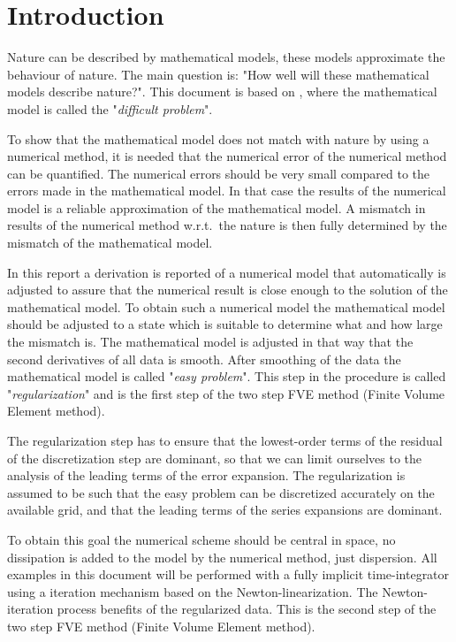 \chapter{Introduction}\label{sec:introduction}
Nature can be described by mathematical models, these models approximate the behaviour of nature.
The main question is: "How well will these mathematical models describe nature?".
This document is based on \citet{Borsboom1998}, where the mathematical model is called the "\textsl{difficult problem}".

To show that the mathematical model does not match with nature by using a numerical method, it is needed that the numerical error of the numerical method can be quantified.
The numerical errors should be very small compared to the errors made in the mathematical model.
In that case the results of the numerical model is a reliable approximation of the mathematical model.
A mismatch in results of the numerical method w.r.t.\ the nature is then fully determined by the mismatch of the mathematical model.

In this report a derivation is reported of a numerical model that automatically is adjusted to assure that the numerical result is close enough to the solution of the mathematical model.
To obtain such a numerical model the mathematical model should be adjusted to a state which is suitable to determine what and how large the mismatch is.
The mathematical model is adjusted in that way that the second derivatives of all data is smooth.
After smoothing of the data the mathematical model is called "\textsl{easy problem}".
This step in the procedure is called "\textsl{regularization}" and is the first step of the two step FVE method (Finite Volume Element method).

The regularization step has to ensure that the lowest-order terms of the residual of the discretization step are dominant, so that we can limit ourselves to the analysis of the leading terms of the error expansion.
The regularization is assumed to be such that the easy problem can be discretized accurately on the available grid, and that the leading terms of the series expansions are dominant.

To obtain this goal the numerical scheme should be central in space, no dissipation is added to the model by the numerical method, just dispersion.
All examples in this document will be performed with a fully implicit time-integrator using a iteration mechanism based on the Newton-linearization.
The Newton-iteration process benefits of the regularized data.
This is the second step of the two step FVE method (Finite Volume Element method).

